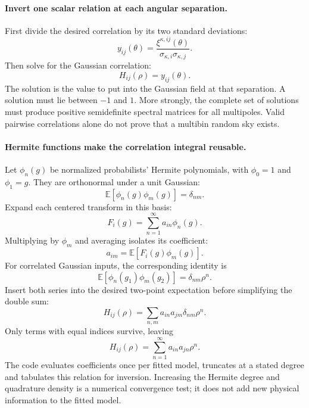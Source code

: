 \documentclass[11pt]{article}
\newcommand{\E}{\mathbb E}
\begin{document}
\paragraph{Invert one scalar relation at each angular separation.}
First divide the desired correlation by its two standard deviations:
\begin{equation}
 y_{ij}(\theta)=\frac{\xi^{\kappa,ij}(\theta)}
                         {\sigma_{\kappa,i}\sigma_{\kappa,j}}.
\end{equation}
Then solve for the Gaussian correlation:
\begin{equation}
 H_{ij}(\rho)=y_{ij}(\theta).
\end{equation}
The solution is the value to put into the Gaussian field at that
separation. A solution must lie between $-1$ and $1$. More strongly,
the complete set of solutions must produce positive semidefinite
spectral matrices for all multipoles. Valid pairwise correlations alone
do not prove that a multibin random sky exists.

\paragraph{Hermite functions make the correlation integral reusable.}
Let $\phi_n(g)$ be normalized probabilists' Hermite polynomials, with
$\phi_0=1$ and $\phi_1=g$. They are orthonormal under a unit Gaussian:
\begin{equation}
 \E[\phi_n(g)\phi_m(g)]=\delta_{nm}.
\end{equation}
Expand each centered transform in this basis:
\begin{equation}
 F_i(g)=\sum_{n=1}^{\infty}a_{in}\phi_n(g).
\end{equation}
Multiplying by $\phi_m$ and averaging isolates its coefficient:
\begin{equation}
 a_{im}=\E[F_i(g)\phi_m(g)].
\end{equation}
For correlated Gaussian inputs, the corresponding identity is
\begin{equation}
 \E[\phi_n(g_1)\phi_m(g_2)]=\delta_{nm}\rho^n.
\end{equation}
Insert both series into the desired two-point expectation before
simplifying the double sum:
\begin{equation}
 H_{ij}(\rho)=\sum_{n,m}a_{in}a_{jm}\delta_{nm}\rho^n.
\end{equation}
Only terms with equal indices survive, leaving
\begin{equation}
 H_{ij}(\rho)=\sum_{n=1}^{\infty}a_{in}a_{jn}\rho^n.
\end{equation}
The code evaluates coefficients once per fitted model, truncates at a
stated degree and tabulates this relation for inversion. Increasing the
Hermite degree and quadrature density is a numerical convergence test;
it does not add new physical information to the fitted model.
\end{document}
